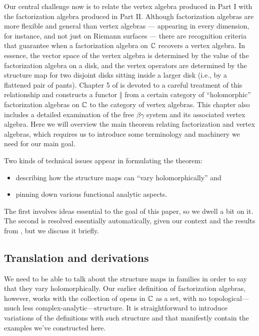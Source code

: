 Our central challenge now is to relate the vertex algebra produced in Part I with the factorization algebra produced in Part II.
Although factorization algebras are more flexible and general than vertex algebras
--- appearing in every dimension, for instance, and not just on Riemann surfaces --- 
there are recognition criteria that guarantee when a factorization algebra on $\mathbb C$ recovers a vertex algebra.
In essence, the vector space of the vertex algebra is determined by the value of the factorization algebra on a disk,
and the vertex operators are determined by the structure map for two disjoint disks sitting inside a larger disk (i.e., by a flattened pair of pants).
Chapter 5 of \cite{CG} is devoted to a careful treatment of this relationship 
and constructs a functor $\Vert$ from a certain category of ``holomorphic'' factorization algebras on $\mathbb C$ to the category of vertex algebras.
This chapter also includes a detailed examination of the free $\beta\gamma$ system and its associated vertex algebra.
Here we will overview the main theorem relating factorization and vertex algebras, 
which requires us to introduce some terminology and machinery we need for our main goal.

Two kinds of technical issues appear in formulating the theorem:
\begin{itemize}
\item describing how the structure maps can ``vary holomorphically'' and
\item pinning down various functional analytic aspects.
\end{itemize}
The first involves ideas essential to the goal of this paper, so we dwell a bit on it.
The second is resolved essentially automatically, given our context and the results from \cite{CG},
but we discuss it briefly.

\subsection{Translation and derivations}

We need to be able to talk about the structure maps in families in order to say that they vary holomorphically.
Our earlier definition of factorization algebras, however, works with the collection of opens in $\mathbb C$ as a set, 
with no topological---much less complex-analytic---structure.
It is straightforward to introduce variations of the definitions with such structure and 
that manifestly contain the examples we've constructed here.

